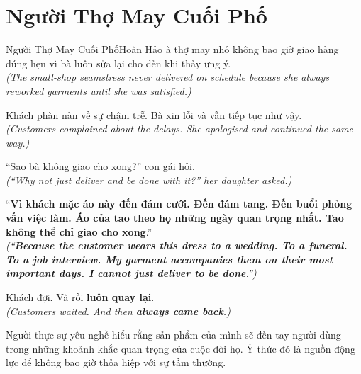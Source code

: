 \section{Người Thợ May Cuối Phố}
\begin{truyen}{Người Thợ May Cuối Phố}{Hoàn Hảo}
à thợ may nhỏ không bao giờ giao hàng đúng hẹn vì bà luôn sửa lại cho đến khi thấy ưng ý.\\
\textit{(The small-shop seamstress never delivered on schedule because she always reworked garments until she was satisfied.)}

Khách phàn nàn về sự chậm trễ. Bà xin lỗi và vẫn tiếp tục như vậy.\\
\textit{(Customers complained about the delays. She apologised and continued the same way.)}

``Sao bà không giao cho xong?'' con gái hỏi.\\
\textit{(``Why not just deliver and be done with it?'' her daughter asked.)}

``\textbf{Vì khách mặc áo này đến đám cưới. Đến đám tang. Đến buổi phỏng vấn việc làm. Áo của tao theo họ những ngày quan trọng nhất. Tao không thể chỉ giao cho xong}.''\\
\textit{(``\textbf{Because the customer wears this dress to a wedding. To a funeral. To a job interview. My garment accompanies them on their most important days. I cannot just deliver to be done}.'')}

Khách đợi. Và rồi \textbf{luôn quay lại}.\\
\textit{(Customers waited. And then \textbf{always came back}.)}
\end{truyen}
\begin{baihoc}
  Người thực sự yêu nghề hiểu rằng sản phẩm của mình sẽ đến tay người dùng trong những khoảnh khắc quan trọng của cuộc đời họ. Ý thức đó là nguồn động lực để không bao giờ thỏa hiệp với sự tầm thường.
\end{baihoc}

